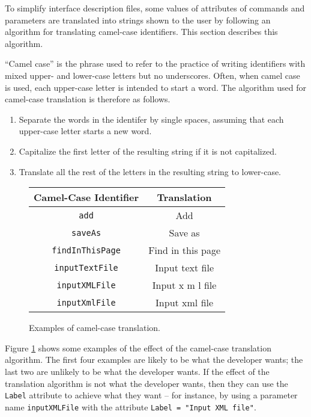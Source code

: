 \documentclass[11pt]{article}
\begin{document}
To simplify interface description files, some values of
attributes of commands and parameters are translated into
strings shown to the user by following an algorithm for
translating camel-case identifiers.  This section
describes this algorithm.

``Camel case'' is the phrase used to refer to the practice
of writing identifiers with mixed upper- and lower-case
letters but no underscores.  Often, when camel case
is used, each upper-case letter is intended to start a word.
The algorithm used for camel-case translation is
therefore as follows.
\begin{enumerate}
\item Separate the words in the identifer by single spaces,
  assuming that each upper-case letter starts a new word.
\item Capitalize the first letter of the resulting string
  if it is not capitalized.
\item Translate all the rest of the letters in the resulting string to
  lower-case.
\end{enumerate}

\begin{figure}

\begin{center}
\begin{tabular}{|c|c|}
Camel-Case Identifier & Translation \\
\hline
\verb/add/ & Add \\
\hline
\verb/saveAs/ & Save as \\
\hline
\verb/findInThisPage/ & Find in this page \\
\hline
\verb/inputTextFile/ & Input text file \\
\hline
\verb/inputXMLFile/ & Input x m l file \\
\hline
\verb/inputXmlFile/ & Input xml file \\
\hline
\end{tabular}
\end{center}

\caption{Examples of camel-case translation.}
\label{camel-case-fig}
\end{figure}

Figure \ref{camel-case-fig} shows some examples of the effect of
the camel-case translation algorithm.  The first four
examples are likely to be what the developer wants; the
last two are unlikely to be what the developer wants.
If the effect of the translation algorithm is not what the
developer wants, then they can use the {\tt Label} attribute
to achieve what they want -- for instance, by using a parameter name
{\tt inputXMLFile} with the attribute \verb/Label = "Input XML file"/.
\end{document}
